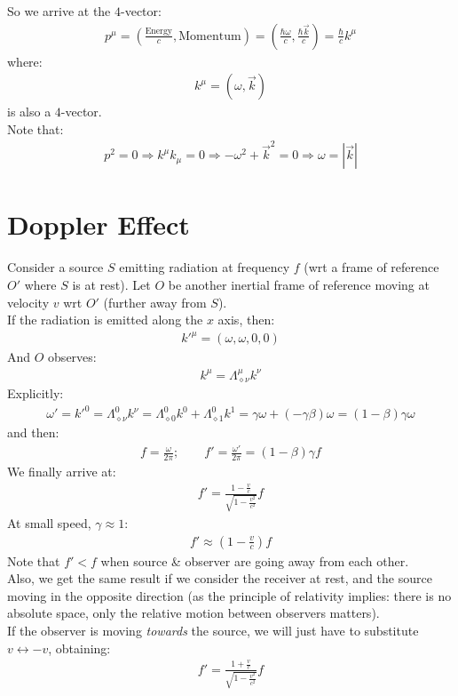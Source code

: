 \documentclass[../template.tex]{subfiles}
\begin{document}
So we arrive at the $4$-vector:
\begin{align*}
    p^\mu = \left(\frac{\text{Energy}}{c}, \text{Momentum} \right) = \left(\frac{\hbar\omega }{c}, \frac{\hbar \vec{k}}{c}  \right) = \frac{\hbar}{c} k^\mu
\end{align*}
where:
\begin{align*}
    k^\mu = (\omega, \vec{k})
\end{align*}
is also a $4$-vector.\\
Note that:
\begin{align*}
    p^2 = 0 \Rightarrow k^\mu k_\mu = 0 \Rightarrow -\omega^2 + \vec{k}^2 = 0 \Rightarrow \omega = |\vec{k}|
\end{align*}

\section{Doppler Effect}
Consider a source $S$ emitting radiation at frequency $f$ (wrt a frame of reference $O'$  where $S$ is at rest). Let $O$ be another inertial frame of reference moving at velocity $v$ wrt $O'$ (further away from $S$).\\
If the radiation is emitted along the $x$ axis, then:
\begin{align*}
    k'^\mu = (\omega, \omega, 0, 0)
\end{align*}
And $O$ observes:
\begin{align*}
    k^\mu = \Lambda^\mu_{\diamond \nu} k^\nu
\end{align*}
Explicitly:
\begin{align*}
    \omega' = k'^0 = \Lambda^0_{\diamond \nu} k^\nu = \Lambda^0_{\diamond 0} k^0 + \Lambda^0_{\diamond 1} k^1 = \gamma \omega + (-\gamma \beta) \omega = (1-\beta) \gamma \omega
\end{align*}
and then:
\begin{align*}
    f = \frac{\omega}{2\pi}; \qquad f' = \frac{\omega'}{2 \pi} = (1- \beta) \gamma f  
\end{align*}
We finally arrive at:
\begin{align*}
    f' = \frac{1-\frac{v}{c} }{\sqrt{1-\frac{v^2}{c^2}} } f
\end{align*}
At small speed, $\gamma \approx 1$:
\begin{align*}
    f' \approx \left(1-\frac{v}{c} \right) f
\end{align*}
Note that $f' < f$ when source \& observer are going away from each other.\\
Also, we get the same result if we consider the receiver at rest, and the source moving in the opposite direction (as the principle of relativity implies: there is no absolute space, only the relative motion between observers matters).\\


If the observer is moving \textit{towards} the source, we will just have to substitute $v \leftrightarrow -v$, obtaining:
\begin{align*}
    f' = \frac{1 + \frac{v}{c} }{\sqrt{1 - \frac{v^2}{c^2}} }f 
\end{align*}  
\end{document}
